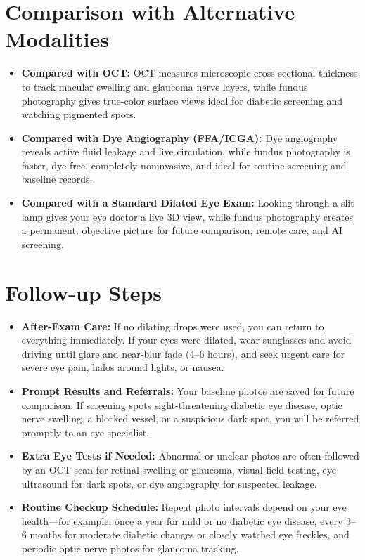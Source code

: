 \section{Comparison with Alternative Modalities}

\begin{itemize}
    \item \textbf{Compared with OCT:} OCT measures microscopic cross-sectional thickness to track macular swelling and glaucoma nerve layers, while fundus photography gives true-color surface views ideal for diabetic screening and watching pigmented spots.
    \item \textbf{Compared with Dye Angiography (FFA/ICGA):} Dye angiography reveals active fluid leakage and live circulation, while fundus photography is faster, dye-free, completely noninvasive, and ideal for routine screening and baseline records.
    \item \textbf{Compared with a Standard Dilated Eye Exam:} Looking through a slit lamp gives your eye doctor a live 3D view, while fundus photography creates a permanent, objective picture for future comparison, remote care, and AI screening.
\end{itemize}

\section{Follow-up Steps}

\begin{itemize}
    \item \textbf{After-Exam Care:} If no dilating drops were used, you can return to everything immediately. If your eyes were dilated, wear sunglasses and avoid driving until glare and near-blur fade (4--6 hours), and seek urgent care for severe eye pain, halos around lights, or nausea.
    \item \textbf{Prompt Results and Referrals:} Your baseline photos are saved for future comparison. If screening spots sight-threatening diabetic eye disease, optic nerve swelling, a blocked vessel, or a suspicious dark spot, you will be referred promptly to an eye specialist.
    \item \textbf{Extra Eye Tests if Needed:} Abnormal or unclear photos are often followed by an OCT scan for retinal swelling or glaucoma, visual field testing, eye ultrasound for dark spots, or dye angiography for suspected leakage.
    \item \textbf{Routine Checkup Schedule:} Repeat photo intervals depend on your eye health---for example, once a year for mild or no diabetic eye disease, every 3--6 months for moderate diabetic changes or closely watched eye freckles, and periodic optic nerve photos for glaucoma tracking.
\end{itemize}


